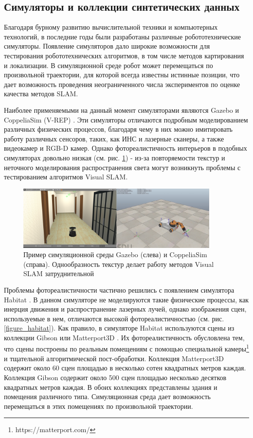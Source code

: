 \documentclass{mipt-thesis-ms}
\begin{document}
	\subsection{Симуляторы и коллекции синтетических данных}
	\label{section_synthetic_datasets}
	
	Благодаря бурному развитию вычислительной техники и компьютерных технологий, в последние годы были разработаны различные робототехнические симуляторы. Появление симуляторов дало широкие возможности для тестирования робототехнических алгоритмов, в том числе методов картирования и локализации. В симуляционной среде робот может перемещаться по произвольной траектории, для которой всегда известны истинные позиции, что дает возможность проведения неограниченного числа экспериментов по оценке качества методов SLAM.
	
	Наиболее применяемыми на данный момент симуляторами являются Gazebo \cite{koenig2004design} и CoppeliaSim (V-REP) \cite{rooban2021coppeliasim}. Эти симуляторы отличаются подробным моделированием различных физических процессов, благодаря чему в них можно имитировать работу различных сенсоров, таких, как ИНС и лазерные сканеры, а также видеокамер и RGB-D камер. Однако фотореалистичность интерьеров в подобных симуляторах довольно низкая (см. рис. \ref{figure_gazebo_vrep}) - из-за повторяемости текстур и неточного моделирования распространения света могут возникнуть проблемы с тестированием алгоритмов Visual SLAM.
	
	\begin{figure}
		\centering
		\includegraphics[width=0.9\textwidth]{img/gazebo_vrep.png}
		\caption{Пример симуляционной среды Gazebo (слева) и CoppeliaSim (справа). Однообразность текстур делает работу методов Visual SLAM затруднительной}
		\label{figure_gazebo_vrep}
	\end{figure}
	
	Проблемы фотореалистичности частично решились с появлением симулятора Habitat \cite{savva2019habitat}. В данном симуляторе не моделируются такие физические процессы, как инерция движения и распространение лазерных лучей, однако изображения сцен, используемые в нем, отличаются высокой фотореалистичностью (см. рис. \ref{figure_habitat}). Как правило, в симуляторе Habitat используются сцены из коллекции Gibson \cite{xia2018gibson} или Matterport3D \cite{chang2017matterport3d}. Их фотореалистичность обусловлена тем, что сцены построены по реальным помещениям с помощью специальной камеры\footnote{https://matterport.com/} и тщательной алгоритмической пост-обработки. Коллекция Matterport3D содержит около 60 сцен площадью в несколько сотен квадратных метров каждая. Коллекция Gibson содержит около 500 сцен площадью несколько десятков квадратных метров каждая. В обоих коллекциях представлены здания и помещения различного типа. Симуляционная среда дает возможность перемещаться в этих помещениях по произвольной траектории.
	
\end{document}
